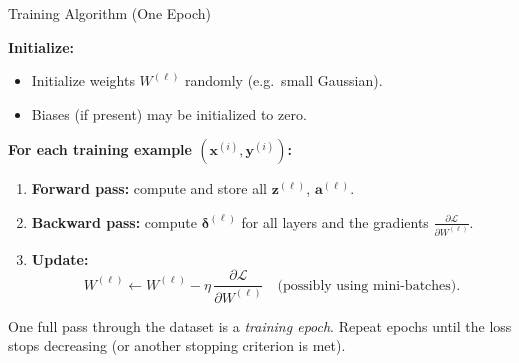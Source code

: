 \documentclass[aspectratio=169]{beamer}
\begin{document}
\begin{frame}{Training Algorithm (One Epoch)}

\textbf{Initialize:}
\begin{itemize}
  \item Initialize weights $W^{(\ell)}$ randomly (e.g.\ small Gaussian).
  \item Biases (if present) may be initialized to zero.
\end{itemize}

\medskip

\textbf{For each training example $(\bm{x}^{(i)},\bm{y}^{(i)})$:}

\begin{enumerate}
  \item \textbf{Forward pass:}
    compute and store all $\bm{z}^{(\ell)}$, $\bm{a}^{(\ell)}$.
  \item \textbf{Backward pass:}
    compute $\bm{\delta}^{(\ell)}$ for all layers and the gradients
    $\frac{\partial \mathcal{L}}{\partial W^{(\ell)}}$.
  \item \textbf{Update:}
    \[
      W^{(\ell)} \leftarrow
      W^{(\ell)} - \eta
      \,\frac{\partial \mathcal{L}}{\partial W^{(\ell)}}
      \quad\text{(possibly using mini-batches)}.
    \]
\end{enumerate}

One full pass through the dataset is a \emph{training epoch}.
Repeat epochs until the loss stops decreasing (or another stopping
criterion is met).

\end{frame}

\end{document}

